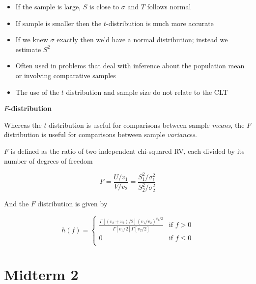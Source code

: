 \documentclass[10pt]{article}
\begin{document}
\begin{itemize}
	\item If the sample is large, $ S$  is close to $ \sigma $  and $ T $ follows normal
	\item If sample is smaller then the $ t $-distribution is much more accurate
	\item If we knew $ \sigma $ exactly then we'd have a normal distribution; instead we estimate $ S^2 $ 
	\item Often used in problems that deal with inference about the population mean or involving comparative samples
	\item The use of the $ t $  distribution and sample size do not relate to the CLT
\end{itemize}





\begin{definition}
	\textbf{$ F $-distribution}

	Whereas the $ t $ distribution is useful for comparisons between sample \textit{means}, the $ F $ distribution is useful for comparisons between sample \textit{variances}.

	$ F $ is defined as the ratio of two independent chi-squared RV, each divided by its number of degrees of freedom

	\begin{equation}
		F = \frac{U /v_1}{V /v_2} = \frac{S_1^2 /\sigma_1^2}{S_2^2 /\sigma_2^2}
	\end{equation}

	And the $ F $ distribution is given by

	\begin{equation}
		h(f) = \begin{cases}
			\frac{\Gamma[(v_2 + v_2) /2](v_1 /v_2)^{v_1 /2}}{\Gamma[v_1 /2]\Gamma[v_2 /2]} & \text{if } f > 0\\
			0 & \text{if } f \le  0 \\
		\end{cases}
	\end{equation}
	
	

\end{definition}



\section{Midterm 2}
\end{document}
